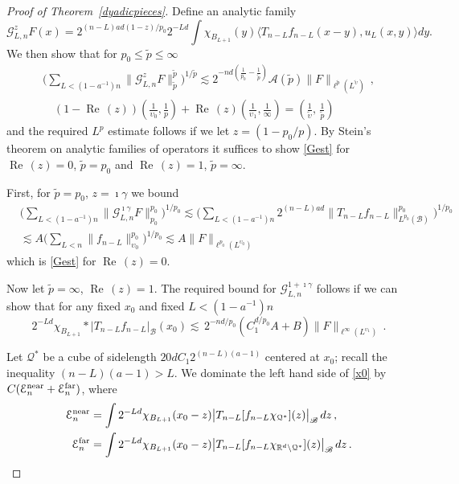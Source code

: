 \documentclass[11pt]{amsart}
\theoremstyle{definition}
\numberwithin{theorem}{section}
\numberwithin{definition}{section}
\renewcommand{\wp}{\upsilon}
\def\Ennear{{\mathcal E_n^{\text{\rm near}}} }
\def\Enfar{{\mathcal E_n^{\text{\rm far}}} }
\def\im{\imath}
\def\biginn#1#2{\big\langle#1,#2\big\rangle}
\newcommand{\Be}{\begin{equation}}
\newcommand{\Ee}{\end{equation}}
\def\Re{\operatorname{Re\,}}
\def\sB{{\mathscr{B}}}
\def\biginn#1#2{\big\langle#1,#2\big\rangle}
\def\lc{\lesssim}
\def\bbR{{\mathbb {R}}}
\def\cA{{\mathcal {A}}}
\def\cG{{\mathcal {G}}}
\def\cQ{{\mathcal {Q}}}
\def\Re{\operatorname{Re\,} }
\begin{document}
\begin{proof}[Proof of Theorem~\ref{dyadicpieces}]
Define an analytic family
$$\cG_{L,n}^z F(x)=  2^{(n-L)ad (1-z)/p_0}
2^{-Ld}\int \chi_{B_{L+1}}(y)
 \biginn{T_{n-L} f_{n-L}(x-y)}{u_L(x,y)} dy.
$$
We then  show that for $p_0\le \widetilde{p}\le \infty$
\begin{multline}\label{Gest}
\Big(\sum_{L<(1-a^{-1})n}\big \|\cG_{L,n}^z
F\big\|_{\widetilde{p}}^{\widetilde{p}} \Big)^{1/\widetilde{p}}
 \lc 2^{-n d(\frac{1}{p_0}-\frac {1}{\widetilde{p}})}
\cA( \widetilde{p})\|F\|_{\ell^{\widetilde{p}}(L^{\widetilde \wp})}\,, \\
\quad
(1-\Re(z))(\frac 1{\wp_0},\frac 1p)+ \Re(z)
(\frac{1}{\wp_1},\frac 1\infty)=(\frac {1}{\widetilde{\wp}},\,
\frac {1}{\widetilde{p}})
\end{multline}
and the required $L^p$ estimate follows if we let $z= (1-p_0/p)$.
By Stein's theorem on analytic families of operators it suffices to show
\eqref{Gest} for $\Re(z)=0$, $\widetilde{p}=p_0$ and
$\Re(z)=1$, $\widetilde{p}=\infty$.





First, for $\widetilde{p}=p_0$, $z=\im \gamma$  we bound
\begin{align*}
&\Big(\sum_{L<(1-a^{-1})n}\big \|\cG_{L,n}^{\im \gamma} F
\big\|_{p_0}^{p_0} \Big)^{1/p_0}
\lc
\Big(\sum_{L<(1-a^{-1})n} 2^{(n-L)ad }
\big\|{T}_{n-L} f_{n-L}\big\|_{L^{p_0}(\sB)}^{p_0}\Big)^{1/p_0}
\\
&\lc A \Big(\sum_{L<n}\big\|f_{n-L}\big\|_{\wp_0}^{p_0}\Big)^{1/p_0}
\lc A\|F\|_{\ell^{p_0}(L^{\wp_0})}
\end{align*}
which is \eqref{Gest} for $\Re(z)=0$.

Now let $\widetilde{p}=\infty$, $\Re(z)=1$.
The required bound for $\cG_{L,n}^{1+\im \gamma}$ follows if we can show that
for any
 fixed $x_0$ and fixed $L<(1-a^{-1})n$
\Be \label{x0}
2^{-Ld} \chi_{B_{L+1}} *
\big| T_{n-L} f_{n-L}\big|_{\sB}(x_0)
\lc \,2^{-n d /p_0} (C_1^{d/p_0} A+B) \|F\|_{\ell^\infty(L^{\wp_1})}\,.
\Ee

Let $\cQ^*$ be a  cube of sidelength $20 d C_1 2^{(n-L)(a-1)}$
centered at $x_0$; recall the inequality   $(n-L)(a-1)>L$.
We dominate  the left hand side of \eqref{x0} by $C(\Ennear+\Enfar)$,
where
\begin{align*}
\Ennear &=
\int 2^{-Ld}\chi_{B_{L+1}}(x_0-z)
 \big| T_{n-L} [f_{n-L}\chi_{\cQ^*}](z)\big|_{\sB} \, dz \, ,
\\
\Enfar &=
\int 2^{-Ld}\chi_{B_{L+1}}(x_0-z)
 \big| T_{n-L} [f_{n-L}\chi_{\bbR^d\setminus\cQ^*}](z)\big|_{\sB} \, dz \, .
\end{align*}


\end{proof}
\end{document}
